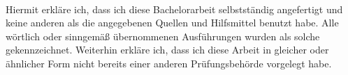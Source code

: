 %
%
%
%


{\ }
\vfill

\begin{flushleft}
	
	Hiermit erkläre ich, dass ich diese Bachelorarbeit selbstständig 
	angefertigt und keine anderen als die angegebenen Quellen und Hilfsmittel 
	benutzt habe. Alle wörtlich oder sinngemäß übernommenen Ausführungen wurden 
	als solche gekennzeichnet. Weiterhin erkläre ich, dass ich diese Arbeit in 
	gleicher oder ähnlicher Form nicht bereits einer anderen Prüfungsbehörde 
	vorgelegt habe.

%	
\end{flushleft}

\vspace*{2cm}
\vspace*{4cm}